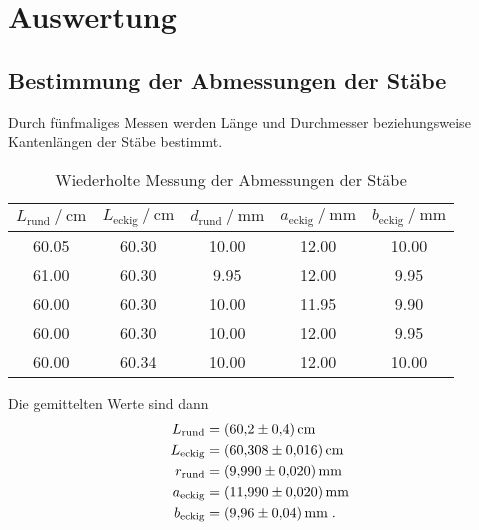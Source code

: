 \section{Auswertung} \label{sec:auswertung}

\subsection{Bestimmung der Abmessungen der Stäbe} \label{sec:abmessungen}

Durch fünfmaliges Messen werden Länge und Durchmesser beziehungsweise Kantenlängen der Stäbe bestimmt.


\begin{table}
\centering
\caption{Wiederholte Messung der Abmessungen der Stäbe}
\begin{tabular}{c c c c c}
\toprule
$L_\text{rund}  \mathbin{/} \si{\centi\meter}$ &
$L_\text{eckig} \mathbin{/} \si{\centi\meter}$ &
$d_\text{rund}  \mathbin{/} \si{\milli\meter}$ &
$a_\text{eckig} \mathbin{/} \si{\milli\meter}$ &
$b_\text{eckig} \mathbin{/} \si{\milli\meter}$ \\
\midrule
\num{60.05} &	\num{60.30} &	\num{10.00} &	\num{12.00} &	\num{10.00} \\
\num{61.00} &	\num{60.30} &	\num{9.95}  &	\num{12.00} &	\num{9.95}  \\
\num{60.00} &	\num{60.30} &	\num{10.00} &	\num{11.95} &	\num{9.90}  \\
\num{60.00} &	\num{60.30} &	\num{10.00} &	\num{12.00} &	\num{9.95}  \\
\num{60.00} &	\num{60.34} &	\num{10.00} &	\num{12.00} &	\num{10.00} \\
\bottomrule
\end{tabular}
\end{table}

Die gemittelten Werte sind dann
\begin{align*}
L_\text{rund}  &= \SI{60.2 \pm 0.4}{\centi\meter}     \\
L_\text{eckig} &= \SI{60.308 \pm 0.016}{\centi\meter} \\
r_\text{rund}  &= \SI{9.990 \pm 0.020}{\milli\meter}  \\
a_\text{eckig} &= \SI{11.990 \pm 0.020}{\milli\meter} \\
b_\text{eckig} &= \SI{9.96 \pm 0.04}{\milli\meter}    \; .
\end{align*}





